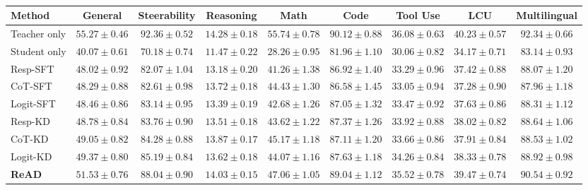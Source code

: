 \begin{table}[t]
\centering
\tiny
\setlength\tabcolsep{1pt}
\caption{}
\begin{tabular}{lcccccccc}
\toprule
\textbf{Method} &
\textbf{General} &
\textbf{Steerability} &
\textbf{Reasoning} &
\textbf{Math} &
\textbf{Code} &
\textbf{Tool Use} &
\textbf{LCU} &
\textbf{Multilingual} \\
\midrule
Teacher only &
$55.27 \pm 0.46$ &
$92.36 \pm 0.52$ &
$14.28 \pm 0.18$ &
$55.74 \pm 0.78$ &
$90.12 \pm 0.88$ &
$36.08 \pm 0.63$ &
$40.23 \pm 0.57$ &
$92.34 \pm 0.66$ \\
Student only &
$40.07 \pm 0.61$ &
$70.18 \pm 0.74$ &
$11.47 \pm 0.22$ &
$28.26 \pm 0.95$ &
$81.96 \pm 1.10$ &
$30.06 \pm 0.82$ &
$34.17 \pm 0.71$ &
$83.14 \pm 0.93$ \\
\midrule
Resp-SFT &
$48.02 \pm 0.92$ &
$82.07 \pm 1.04$ &
$13.18 \pm 0.20$ &
$41.26 \pm 1.38$ &
$86.92 \pm 1.40$ &
$33.29 \pm 0.96$ &
$37.42 \pm 0.88$ &
$88.07 \pm 1.20$ \\
CoT-SFT &
$48.29 \pm 0.88$ &
$82.61 \pm 0.98$ &
$13.72 \pm 0.18$ &
$44.43 \pm 1.30$ &
$86.58 \pm 1.45$ &
$33.05 \pm 0.94$ &
$37.28 \pm 0.90$ &
$87.96 \pm 1.18$ \\
Logit-SFT &
$48.46 \pm 0.86$ &
$83.14 \pm 0.95$ &
$13.39 \pm 0.19$ &
$42.68 \pm 1.26$ &
$87.05 \pm 1.32$ &
$33.47 \pm 0.92$ &
$37.63 \pm 0.86$ &
$88.31 \pm 1.12$ \\
Resp-KD &
$48.78 \pm 0.84$ &
$83.76 \pm 0.90$ &
$13.51 \pm 0.18$ &
$43.62 \pm 1.22$ &
$87.37 \pm 1.26$ &
$33.92 \pm 0.88$ &
$38.02 \pm 0.82$ &
$88.64 \pm 1.06$ \\
CoT-KD &
$49.05 \pm 0.82$ &
$84.28 \pm 0.88$ &
$13.87 \pm 0.17$ &
$45.17 \pm 1.18$ &
$87.11 \pm 1.20$ &
$33.66 \pm 0.86$ &
$37.91 \pm 0.84$ &
$88.53 \pm 1.02$ \\
Logit-KD &
$49.37 \pm 0.80$ &
$85.19 \pm 0.84$ &
$13.62 \pm 0.18$ &
$44.07 \pm 1.16$ &
$87.63 \pm 1.18$ &
$34.26 \pm 0.84$ &
$38.33 \pm 0.78$ &
$88.92 \pm 0.98$ \\
\midrule
\textbf{ReAD} &
$\mathbf{51.53 \pm 0.76}$ &
$\mathbf{88.04 \pm 0.90}$ &
$\mathbf{14.03 \pm 0.15}$ &
$\mathbf{47.06 \pm 1.05}$ &
$\mathbf{89.04 \pm 1.12}$ &
$\mathbf{35.52 \pm 0.78}$ &
$\mathbf{39.47 \pm 0.74}$ &
$\mathbf{90.54 \pm 0.92}$ \\
\bottomrule
\end{tabular}
\label{tab:qwen_150m}
\end{table}


